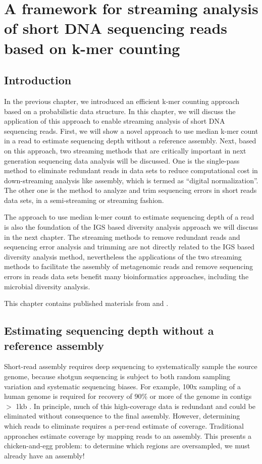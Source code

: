 \chapter{A framework for streaming analysis of short DNA sequencing reads based
on k-mer counting}

\section{Introduction}

In the previous chapter, we introduced an efficient k-mer counting approach based on a
probabilistic data structure. In this chapter, we will discuss the application
of this approach to enable streaming analysis of short DNA sequencing reads.
First, we will show a novel approach to use median k-mer count in a read to estimate
sequencing depth without a reference assembly. Next, based on this approach, two
streaming methods that are critically important in next generation sequencing
data analysis will be discussed. One is the single-pass method to eliminate redundant reads in
data sets to reduce computational cost in down-streaming analysis like
assembly, which is termed as ``digital normalization''. The other one is the
method to analyze and trim sequencing errors in short reads data sets, in a
semi-streaming or streaming fashion.

The approach to use median k-mer count to estimate sequencing depth of a read is
also the foundation of the IGS based diversity analysis approach we will
discuss in the next chapter. The streaming methods to remove redundant reads
and sequencing error analysis and trimming are not directly related to the IGS
based diversity analysis method, nevertheless the applications of the two
streaming methods to facilitate the assembly of metagenomic reads and remove
sequencing errors in reads data sets benefit many bioinformatics approaches,
including the microbial diversity analysis.

This chapter contains published materials from \cite{Zhang2014} \cite{Brown2012} and \cite{zhang2015crossing}.
% 
\section{Estimating sequencing depth without a reference assembly}

Short-read assembly requires deep sequencing to systematically sample the
source genome, because shotgun sequencing is subject to both random sampling
variation and systematic sequencing biases. For example, 100x sampling of a
human genome is required for recovery of 90\% or more of the genome in contigs
$>$ 1kb \cite{pubmed21187386}. In principle, much of this high-coverage data is
redundant and could be eliminated without consequence to the final assembly.
However, determining which reads to eliminate requires a per-read estimate of
coverage. Traditional approaches estimate coverage by mapping reads to an
assembly.  This presents a chicken-and-egg problem: to determine which regions
are oversampled, we must already have an assembly!

